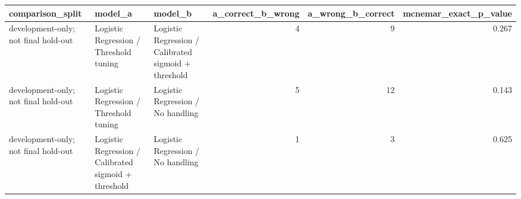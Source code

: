 \begin{tabular}{lllrrr}
\toprule
comparison_split & model_a & model_b & a_correct_b_wrong & a_wrong_b_correct & mcnemar_exact_p_value \\
\midrule
development-only; not final hold-out & Logistic Regression / Threshold tuning & Logistic Regression / Calibrated sigmoid + threshold & 4 & 9 & 0.267 \\
development-only; not final hold-out & Logistic Regression / Threshold tuning & Logistic Regression / No handling & 5 & 12 & 0.143 \\
development-only; not final hold-out & Logistic Regression / Calibrated sigmoid + threshold & Logistic Regression / No handling & 1 & 3 & 0.625 \\
\bottomrule
\end{tabular}
